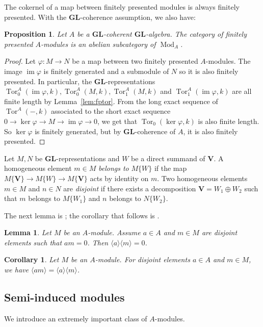 \documentclass[12pt]{amsart}
\newcommand{\bV}{\mathbf{V}}
\renewcommand{\phi}{\varphi}
\DeclareMathOperator{\im}{im}
\DeclareMathOperator{\Tor}{Tor}
\DeclareMathOperator{\Mod}{Mod}
\newcommand{\GL}{\mathbf{GL}}
\numberwithin{equation}{section}
\newtheorem{proposition}[equation]{Proposition}
\newtheorem{lemma}[equation]{Lemma}
\newtheorem{corollary}[equation]{Corollary}
\theoremstyle{definition}
\theoremstyle{plain}
\begin{document}
The cokernel of a map between finitely presented modules is always finitely presented. With the $\GL$-coherence assumption, we also have:
\begin{proposition}
    Let $A$ be a $\GL$-coherent $\GL$-algebra. The category of finitely presented $A$-modules is an abelian subcategory of $\Mod_A$.
\end{proposition}
\begin{proof}
 Let $\phi \colon M \to N$ be a map between two finitely presented $A$-modules. The image $\im \phi$ is finitely generated and a submodule of $N$ so it is also finitely presented. In particular, the $\GL$-representations $\Tor_0^A(\im \phi, k), \Tor_0^A(M, k), \Tor_1^A(M, k)$ and $\Tor_1^A(\im \phi, k)$ are all finite length by Lemma~\ref{lem:fptor}. From the long exact sequence of $\Tor^A(-, k)$ associated to the short exact sequence $0 \to \ker \phi \to M \to \im \phi \to 0$, we get that $\Tor_0(\ker \phi, k)$ is also finite length. So $\ker \phi$ is finitely generated, but by $\GL$-coherence of $A$, it is also finitely presented.
\end{proof}


Let $M, N$ be $\GL$-representations and $W$ be a direct summand of $\bV$. A homogeneous element $m \in M$ \textit{belongs to} $M\{W\}$ if the map $M\{\bV\} \to M\{W\} \to M\{\bV\}$ acts by identity on $m$. Two homogeneous elements $m \in M$ and $n \in N$ are \textit{disjoint} if there exists a decomposition $\bV = W_1 \oplus W_2$ such that $m$ belongs to $M\{W_1\}$ and $n$ belongs to $N\{W_2\}$. 

The next lemma is \cite[Lemma~2.16]{gan25pol}; the corollary that follows is \cite[Corollary~2.17]{gan25pol}.

\begin{lemma}\label{lem:disjointnzd}
Let $M$ be an $A$-module. Assume $a \in A$ and $m\in M$ are disjoint elements such that $am=0$. Then $\langle a\rangle \langle m \rangle = 0$.
\end{lemma}

\begin{corollary}\label{cor:disjoint}
Let $M$ be an $A$-module. For disjoint elements $a \in A$ and $m\in M$, we have $\langle a m \rangle = \langle a \rangle \langle m \rangle$.
\end{corollary}


\subsection{Semi-induced modules} \label{ss:semiind}
We introduce an extremely important class of $A$-modules.
\end{document}
